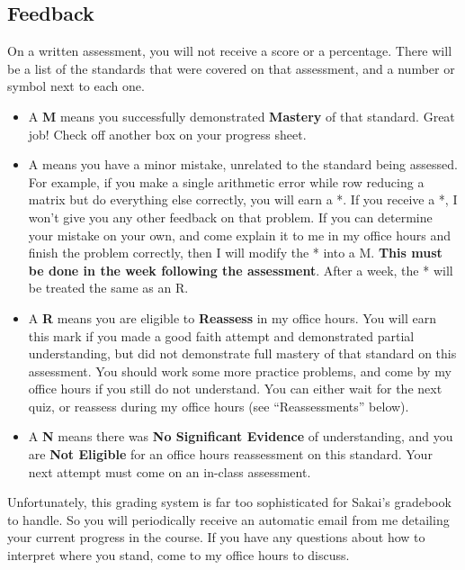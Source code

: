 \documentclass[letterpaper]{article}
\begin{document}
\subsection*{\fontsize{10}{12}\selectfont Feedback}

On a written assessment, you will not receive a score or a percentage.  There will be a list of the standards that were covered on that assessment, and a number or symbol next to each one.
\begin{itemize}
\item A {\bf M} means you successfully demonstrated {\bf Mastery} of that standard.  Great job!  Check off another box on your progress sheet.
\item A {\bf *} means you have a minor mistake, unrelated to the standard being assessed.  For example, if you make a single arithmetic error while row reducing a matrix but do everything else correctly, you will earn a *.  If you receive a *, I won't give you any other feedback on that problem.  If you can determine your mistake on your own, and come explain it to me in my office hours and finish the problem correctly, then I will modify the * into a M.  {\bf This must be done in the week following the assessment}.  After a week, the * will be treated the same as an R.
\item A {\bf R} means you are eligible to {\bf Reassess} in my office hours.  You will earn this mark if you made a good faith attempt and demonstrated partial understanding, but did not demonstrate full mastery of that standard on this assessment.  You should work some more practice problems, and come by my office hours if you still do not understand.  You can either wait for the next quiz, or reassess during my office hours (see ``Reassessments'' below).
\item A {\bf N} means there was {\bf No Significant Evidence} of understanding, and you are {\bf Not Eligible} for an office hours reassessment on this standard.  Your next attempt must come on an in-class assessment.  
\end{itemize}

Unfortunately, this grading system is far too sophisticated for Sakai's gradebook to handle.  So you will periodically receive an automatic email from me detailing your current progress in the course.  If you have any questions about how to interpret where you stand, come to my office hours to discuss.
\end{document}
